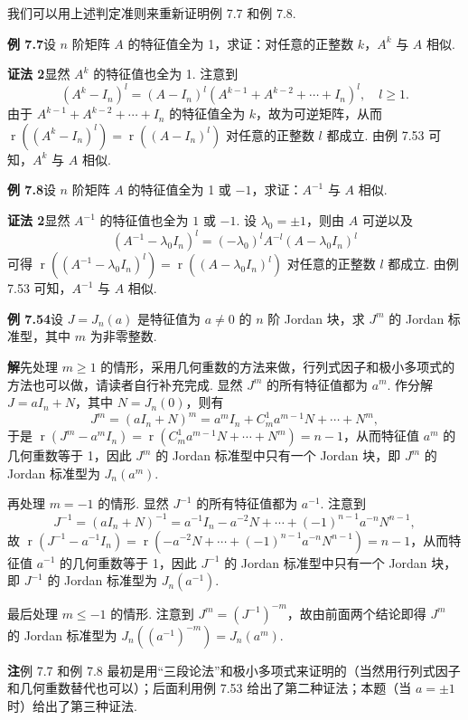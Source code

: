 \documentclass[UTF8,12pt,a4paper,fontset=fandol]{ctexart}
\begin{document}
我们可以用上述判定准则来重新证明例 7.7 和例 7.8.

\noindent\textbf{例 7.7}\quad 设 $n$ 阶矩阵 $A$ 的特征值全为 1，求证：对任意的正整数 $k$，$A^k$ 与 $A$ 相似.

\noindent\textbf{证法 2}\quad 显然 $A^k$ 的特征值也全为 1. 注意到
\[
(A^k-I_n)^l=(A-I_n)^l(A^{k-1}+A^{k-2}+\cdots+I_n)^l,\quad l\ge 1.
\]
由于 $A^{k-1}+A^{k-2}+\cdots+I_n$ 的特征值全为 $k$，故为可逆矩阵，从而 $\operatorname{r}((A^k-I_n)^l)=\operatorname{r}((A-I_n)^l)$ 对任意的正整数 $l$ 都成立. 由例 7.53 可知，$A^k$ 与 $A$ 相似.

\noindent\textbf{例 7.8}\quad 设 $n$ 阶矩阵 $A$ 的特征值全为 1 或 $-1$，求证：$A^{-1}$ 与 $A$ 相似.

\noindent\textbf{证法 2}\quad 显然 $A^{-1}$ 的特征值也全为 $1$ 或 $-1$. 设 $\lambda_0=\pm 1$，则由 $A$ 可逆以及
\[
(A^{-1}-\lambda_0I_n)^l=(-\lambda_0)^lA^{-l}(A-\lambda_0I_n)^l
\]
可得 $\operatorname{r}((A^{-1}-\lambda_0I_n)^l)=\operatorname{r}((A-\lambda_0I_n)^l)$ 对任意的正整数 $l$ 都成立. 由例 7.53 可知，$A^{-1}$ 与 $A$ 相似.

\noindent\textbf{例 7.54}\quad 设 $J=J_n(a)$ 是特征值为 $a\ne 0$ 的 $n$ 阶 Jordan 块，求 $J^m$ 的 Jordan 标准型，其中 $m$ 为非零整数.

\noindent\textbf{解}\quad 先处理 $m\ge 1$ 的情形，采用几何重数的方法来做，行列式因子和极小多项式的方法也可以做，请读者自行补充完成. 显然 $J^m$ 的所有特征值都为 $a^m$. 作分解 $J=aI_n+N$，其中 $N=J_n(0)$，则有
\[
J^m=(aI_n+N)^m=a^mI_n+C_m^1a^{m-1}N+\cdots+N^m,
\]
于是 $\operatorname{r}(J^m-a^mI_n)=\operatorname{r}(C_m^1a^{m-1}N+\cdots+N^m)=n-1$，从而特征值 $a^m$ 的几何重数等于 1，因此 $J^m$ 的 Jordan 标准型中只有一个 Jordan 块，即 $J^m$ 的 Jordan 标准型为 $J_n(a^m)$.

再处理 $m=-1$ 的情形. 显然 $J^{-1}$ 的所有特征值都为 $a^{-1}$. 注意到
\[
J^{-1}=(aI_n+N)^{-1}=a^{-1}I_n-a^{-2}N+\cdots+(-1)^{n-1}a^{-n}N^{n-1},
\]
故 $\operatorname{r}(J^{-1}-a^{-1}I_n)=\operatorname{r}(-a^{-2}N+\cdots+(-1)^{n-1}a^{-n}N^{n-1})=n-1$，从而特征值 $a^{-1}$ 的几何重数等于 1，因此 $J^{-1}$ 的 Jordan 标准型中只有一个 Jordan 块，即 $J^{-1}$ 的 Jordan 标准型为 $J_n(a^{-1})$.

最后处理 $m\le -1$ 的情形. 注意到 $J^m=(J^{-1})^{-m}$，故由前面两个结论即得 $J^m$ 的 Jordan 标准型为 $J_n((a^{-1})^{-m})=J_n(a^m)$.

\noindent\textbf{注}\quad 例 7.7 和例 7.8 最初是用“三段论法”和极小多项式来证明的（当然用行列式因子和几何重数替代也可以）；后面利用例 7.53 给出了第二种证法；本题（当 $a=\pm1$ 时）给出了第三种证法.
\end{document}
